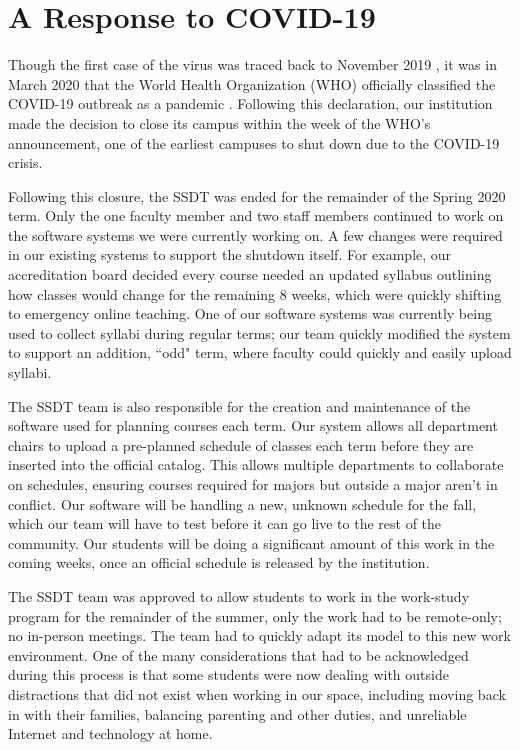 \section{A Response to COVID-19}
Though the first case of the virus was traced back to November 2019 \cite{}, it was in March 2020 that the World Health Organization (WHO) officially classified the COVID-19 outbreak as a pandemic \cite{}. Following this declaration, our institution made the decision to close its campus within the week of the WHO's announcement, one of the earliest campuses to shut down due to the COVID-19 crisis.

Following this closure, the SSDT was ended for the remainder of the Spring 2020 term. Only the one faculty member and two staff members continued to work on the software systems we were currently working on. A few changes were required in our existing systems to support the shutdown itself. For example, our accreditation board decided every course needed an updated syllabus outlining how classes would change for the remaining 8 weeks, which were quickly shifting to emergency online teaching. One of our software systems was currently being used to collect syllabi during regular terms; our team quickly modified the system to support an addition, ``odd" term, where faculty could quickly and easily upload syllabi.

The SSDT team is also responsible for the creation and maintenance of the software used for planning courses each term. Our system allows all department chairs to upload a pre-planned schedule of classes each term before they are inserted into the official catalog. This allows multiple departments to collaborate on schedules, ensuring courses required for majors but outside a major aren't in conflict. Our software will be handling a new, unknown schedule for the fall, which our team will have to test before it can go live to the rest of the community. Our students will be doing a significant amount of this work in the coming weeks, once an official schedule is released by the institution.

The SSDT team was approved to allow students to work in the work-study program for the remainder of the summer, only the work had to be remote-only; no in-person meetings. The team had to quickly adapt its model to this new work environment. One of the many considerations that had to be acknowledged during this process is that some students were now dealing with outside distractions that did not exist when working in our space, including moving back in with their families, balancing parenting and other duties, and unreliable Internet and technology at home.


